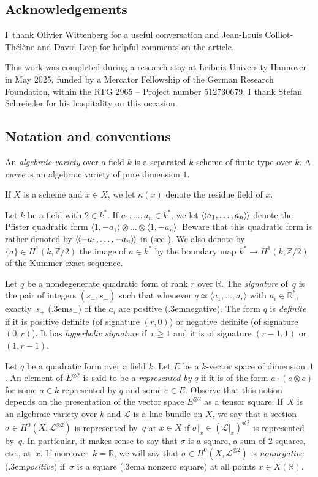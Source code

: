 \documentclass{amsart}
\theoremstyle{definition}
\theoremstyle{remark}
\numberwithin{equation}{section}
\newcommand{\llangle}{\langle\kern-.1em\langle}
\newcommand{\rrangle}{\rangle\kern-.1em\rangle}
\def\resp {\text{resp.}\kern.3em}
\def\Z{\mathbb Z}
\def\R{\mathbb R}
\def\cL{\mathcal{L}}
\begin{document}
\subsection{Acknowledgements}

I~thank Olivier Wittenberg for a useful conversation and Jean-Louis Colliot-Th\'el\`ene
and David Leep for helpful comments on the article.

This work was completed during a research stay at Leibniz University Hannover in May 2025, funded by a Mercator Fellowship of the German Research Foundation, within the RTG 2965 -- Project number 512730679.
I thank Stefan Schreieder for his hospitality on this occasion.


\subsection{Notation and conventions}

An \textit{algebraic variety} over a field $k$ is a separated $k$-scheme of finite type over $k$. A \textit{curve} is an algebraic variety of pure dimension $1$.

If $X$ is a scheme and $x\in X$, we let $\kappa(x)$ denote the residue field of $x$.

Let $k$ be a field with $2\in k^*$. If $a_1,\dots, a_n\in k^*$, we let $\llangle a_1,\dots, a_n\rrangle$ denote the Pfister quadratic form $\langle 1,-a_1\rangle\otimes\dots\otimes\langle 1,-a_n\rangle$. Beware that this quadratic form is rather denoted by $\llangle -a_1,\dots, -a_n\rrangle$ in \cite{Lam} (see \cite[X.1.1]{Lam}).
We also denote by ${\{a\}\in H^1(k,\Z/2)}$ the image of $a\in k^*$ by the boundary map $k^*\to H^1(k,\Z/2)$ of the Kummer exact sequence.

Let $q$ be a nondegenerate quadratic form of rank $r$ over $\R$. The \textit{signature} of~$q$ is the pair of integers $(s_+,s_-)$ such that whenever $q\simeq\langle a_1,\dots,a_r\rangle$ with ${a_i\in\R^*}$, exactly~$s_+$ (\resp $s_-$) of the $a_i$ are positive (\resp negative). The form $q$ is \textit{definite} if it is positive definite (of signature $(r,0)$) or negative definite (of signature~$(0,r)$). It has \textit{hyperbolic signature} if~$r\geq 1$ and it is of signature $(r-1,1)$ or~$(1,r-1)$.

Let $q$ be a quadratic form over a field $k$. Let $E$ be a $k$-vector space of dimension~$1$.
An element of $E^{\otimes 2}$ is said to be a \textit{represented by} $q$ if it is of the form $a\cdot (e\otimes e)$ for some $a\in k$ represented by $q$ and some $e\in E$. 
Observe that this notion depends on the presentation of the vector space $E^{\otimes 2}$ as a tensor square. If~$X$ is an algebraic variety over $k$ and $\cL$ is a line bundle on $X$, we say that a section~${\sigma\in H^0(X,\cL^{\otimes 2})}$ is represented by~$q$ at $x\in X$ if $\sigma|_x\in (\cL|_x)^{\otimes 2}$ is represented by~$q$. In particular, it makes sense to say that $\sigma$ is a square, a sum of $2$ squares, etc., at~$x$.
If moreover~${k=\R}$, we will say that $\sigma\in H^0(X,\cL^{\otimes 2})$ is \textit{nonnegative} (\resp \textit{positive}) if~$\sigma$ is a square (\resp a nonzero square) at all points $x\in X(\R)$.
\end{document}
